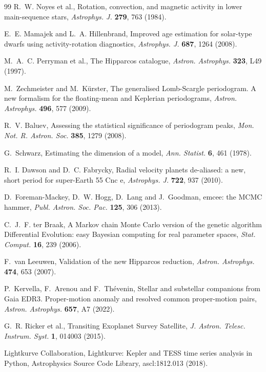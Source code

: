 \documentclass[3p,11pt]{elsarticle}
\begin{document}
\begin{thebibliography}{99}
R.~W. Noyes et al., Rotation, convection, and magnetic activity in lower main-sequence stars,
\emph{Astrophys. J.} \textbf{279}, 763 (1984).

E.~E. Mamajek and L.~A. Hillenbrand, Improved age estimation for solar-type dwarfs using
activity-rotation diagnostics, \emph{Astrophys. J.} \textbf{687}, 1264 (2008).

M.~A.~C. Perryman et al., The Hipparcos catalogue, \emph{Astron. Astrophys.} \textbf{323}, L49 (1997).

M.~Zechmeister and M.~K\"urster, The generalised Lomb-Scargle periodogram. A new formalism for the
floating-mean and Keplerian periodograms, \emph{Astron. Astrophys.} \textbf{496}, 577 (2009).

R.~V. Baluev, Assessing the statistical significance of periodogram peaks, \emph{Mon. Not. R. Astron.
Soc.} \textbf{385}, 1279 (2008).

G.~Schwarz, Estimating the dimension of a model, \emph{Ann. Statist.} \textbf{6}, 461 (1978).

R.~I. Dawson and D.~C. Fabrycky, Radial velocity planets de-aliased: a new, short period for super-Earth
55 Cnc e, \emph{Astrophys. J.} \textbf{722}, 937 (2010).

D.~Foreman-Mackey, D.~W. Hogg, D.~Lang and J.~Goodman, emcee: the MCMC hammer, \emph{Publ. Astron. Soc.
Pac.} \textbf{125}, 306 (2013).

C.~J.~F. ter Braak, A Markov chain Monte Carlo version of the genetic algorithm Differential Evolution:
easy Bayesian computing for real parameter spaces, \emph{Stat. Comput.} \textbf{16}, 239 (2006).

F.~van Leeuwen, Validation of the new Hipparcos reduction, \emph{Astron. Astrophys.} \textbf{474}, 653
(2007).

P.~Kervella, F.~Arenou and F.~Th\'evenin, Stellar and substellar companions from Gaia EDR3.
Proper-motion anomaly and resolved common proper-motion pairs, \emph{Astron. Astrophys.} \textbf{657},
A7 (2022).

G.~R. Ricker et al., Transiting Exoplanet Survey Satellite, \emph{J. Astron. Telesc. Instrum. Syst.}
\textbf{1}, 014003 (2015).

Lightkurve Collaboration, Lightkurve: Kepler and TESS time series analysis in Python, Astrophysics
Source Code Library, ascl:1812.013 (2018).

\end{thebibliography}
\end{document}
